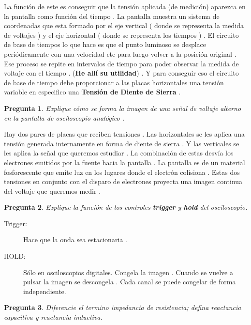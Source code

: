 \documentclass[a4paper,12pt]{article}
\newtheorem{preg}{Pregunta} %
\begin{document}
La función de este es conseguir que la tensión aplicada (de medición) aparezca en la pantalla como función del tiempo . La pantalla muestra un sistema de coordenadas que esta formado por el eje vertical ( donde se representa la medida de voltajes ) y el eje horizontal ( donde se representa los tiempos ) . El circuito de base de tiempos lo que hace es que el punto luminoso se desplace periódicamente con una velocidad cte para luego volver a la posición original . Ese proceso se repite en intervalos de tiempo para poder observar la medida de voltaje con el tiempo . (\textbf{He allí su utilidad}) . Y para conseguir eso el circuito de base de tiempo debe proporcionar a las placas horizontales una tensión variable en especifico una \textbf{Tensión de Diente de Sierra} .   



\begin{preg}
Explique cómo se forma la imagen de una señal de voltaje alterno en la pantalla de osciloscopio analógico . 
\end{preg}


Hay dos pares de placas que reciben tensiones . Las horizontales se les aplica una tensión generada internamente en forma de diente de sierra . Y las verticales se les aplica la señal que queremos estudiar . La combinación de estas desvía los electrones emitidos por la fuente hacia la pantalla . La pantalla es de un material fosforescente que emite luz en los lugares donde el electrón colisiona . Estas dos tensiones en conjunto con el disparo de electrones proyecta una imagen continua del voltaje que queremos medir .  


\begin{preg}
Explique la función de los controles \textbf{trigger} y \textbf{hold} del osciloscopio.
\end{preg}



\begin{description}
\item[Trigger:] Hace que la onda sea estacionaria . 
\item[HOLD:]Sólo en osciloscopios digitales.  Congela la imagen . Cuando se vuelve a pulsar la imagen se descongela . Cada canal se puede congelar de forma independiente. 
\end{description}



\begin{preg}
Diferencie el termino impedancia de resistencia; defina reactancia capacitiva y reactancia inductiva. 
\end{preg}
\end{document}
